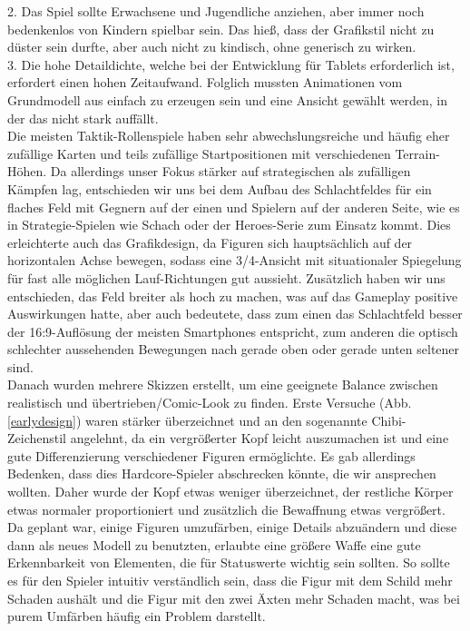 \documentclass[extern,palatino]{cgBA}
\begin{document}
2. Das Spiel sollte Erwachsene und Jugendliche anziehen, aber immer noch bedenkenlos von Kindern spielbar sein. Das hieß, dass der Grafikstil nicht zu düster sein durfte, aber auch nicht zu kindisch, ohne generisch zu wirken.
\\3. Die hohe Detaildichte, welche bei der Entwicklung für Tablets erforderlich ist, erfordert einen hohen Zeitaufwand. Folglich mussten Animationen vom Grundmodell aus einfach zu erzeugen sein und eine Ansicht gewählt werden, in der das nicht stark auffällt.
\\Die meisten Taktik-Rollenspiele haben sehr abwechslungsreiche und häufig eher zufällige Karten und teils zufällige Startpositionen mit verschiedenen Terrain-Höhen. Da allerdings unser Fokus stärker auf strategischen als zufälligen Kämpfen lag, entschieden wir uns bei dem Aufbau des Schlachtfeldes für ein flaches Feld mit Gegnern auf der einen und Spielern auf der anderen Seite, wie es in Strategie-Spielen wie Schach oder der Heroes-Serie zum Einsatz kommt. Dies erleichterte auch das Grafikdesign, da Figuren sich hauptsächlich auf der horizontalen Achse bewegen, sodass eine 3/4-Ansicht mit situationaler Spiegelung für fast alle möglichen Lauf-Richtungen gut aussieht. Zusätzlich haben wir uns entschieden, das Feld breiter als hoch zu machen, was auf das Gameplay positive Auswirkungen hatte, aber auch bedeutete, dass zum einen das Schlachtfeld besser der 16:9-Auflösung der meisten Smartphones entspricht, zum anderen die optisch schlechter aussehenden Bewegungen nach gerade oben oder gerade unten seltener sind.
\\Danach wurden mehrere Skizzen erstellt, um eine geeignete Balance zwischen realistisch und übertrieben/Comic-Look zu finden. Erste Versuche (Abb.\ref{earlydesign}) waren stärker überzeichnet und an den sogenannte Chibi-Zeichenstil angelehnt, da ein vergrößerter Kopf leicht auszumachen ist und eine gute Differenzierung verschiedener Figuren ermöglichte. Es gab allerdings Bedenken, dass dies Hardcore-Spieler abschrecken könnte, die wir ansprechen wollten. Daher wurde der Kopf etwas weniger überzeichnet, der restliche Körper etwas normaler proportioniert und zusätzlich die Bewaffnung etwas vergrößert. Da geplant war, einige Figuren umzufärben, einige Details abzuändern und diese dann als neues Modell zu benutzten, erlaubte eine größere Waffe eine gute Erkennbarkeit von Elementen, die für Statuswerte wichtig sein sollten. So sollte es für den Spieler intuitiv verständlich sein, dass die Figur mit dem Schild mehr Schaden aushält und die Figur mit den zwei Äxten mehr Schaden macht, was bei purem Umfärben häufig ein Problem darstellt.
\end{document}
